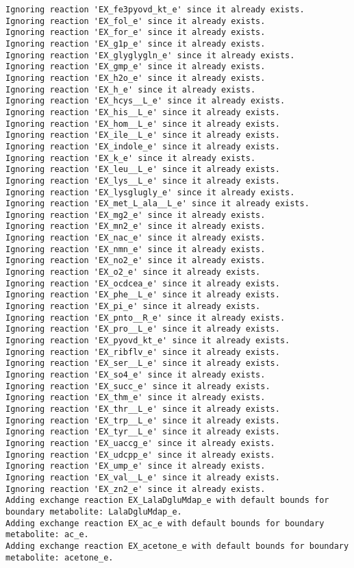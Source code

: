 \documentclass[
  letterpaper,
  DIV=11,
  numbers=noendperiod]{scrartcl}
\begin{document}
\begin{verbatim}
Ignoring reaction 'EX_fe3pyovd_kt_e' since it already exists.
Ignoring reaction 'EX_fol_e' since it already exists.
Ignoring reaction 'EX_for_e' since it already exists.
Ignoring reaction 'EX_g1p_e' since it already exists.
Ignoring reaction 'EX_glyglygln_e' since it already exists.
Ignoring reaction 'EX_gmp_e' since it already exists.
Ignoring reaction 'EX_h2o_e' since it already exists.
Ignoring reaction 'EX_h_e' since it already exists.
Ignoring reaction 'EX_hcys__L_e' since it already exists.
Ignoring reaction 'EX_his__L_e' since it already exists.
Ignoring reaction 'EX_hom__L_e' since it already exists.
Ignoring reaction 'EX_ile__L_e' since it already exists.
Ignoring reaction 'EX_indole_e' since it already exists.
Ignoring reaction 'EX_k_e' since it already exists.
Ignoring reaction 'EX_leu__L_e' since it already exists.
Ignoring reaction 'EX_lys__L_e' since it already exists.
Ignoring reaction 'EX_lysglugly_e' since it already exists.
Ignoring reaction 'EX_met_L_ala__L_e' since it already exists.
Ignoring reaction 'EX_mg2_e' since it already exists.
Ignoring reaction 'EX_mn2_e' since it already exists.
Ignoring reaction 'EX_nac_e' since it already exists.
Ignoring reaction 'EX_nmn_e' since it already exists.
Ignoring reaction 'EX_no2_e' since it already exists.
Ignoring reaction 'EX_o2_e' since it already exists.
Ignoring reaction 'EX_ocdcea_e' since it already exists.
Ignoring reaction 'EX_phe__L_e' since it already exists.
Ignoring reaction 'EX_pi_e' since it already exists.
Ignoring reaction 'EX_pnto__R_e' since it already exists.
Ignoring reaction 'EX_pro__L_e' since it already exists.
Ignoring reaction 'EX_pyovd_kt_e' since it already exists.
Ignoring reaction 'EX_ribflv_e' since it already exists.
Ignoring reaction 'EX_ser__L_e' since it already exists.
Ignoring reaction 'EX_so4_e' since it already exists.
Ignoring reaction 'EX_succ_e' since it already exists.
Ignoring reaction 'EX_thm_e' since it already exists.
Ignoring reaction 'EX_thr__L_e' since it already exists.
Ignoring reaction 'EX_trp__L_e' since it already exists.
Ignoring reaction 'EX_tyr__L_e' since it already exists.
Ignoring reaction 'EX_uaccg_e' since it already exists.
Ignoring reaction 'EX_udcpp_e' since it already exists.
Ignoring reaction 'EX_ump_e' since it already exists.
Ignoring reaction 'EX_val__L_e' since it already exists.
Ignoring reaction 'EX_zn2_e' since it already exists.
Adding exchange reaction EX_LalaDgluMdap_e with default bounds for boundary metabolite: LalaDgluMdap_e.
Adding exchange reaction EX_ac_e with default bounds for boundary metabolite: ac_e.
Adding exchange reaction EX_acetone_e with default bounds for boundary metabolite: acetone_e.

\end{verbatim}
\end{document}
